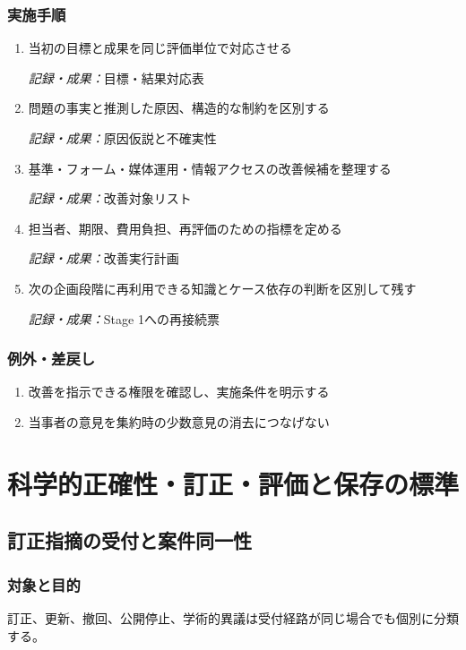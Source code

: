 \documentclass[a4paper,11pt]{article}
\begin{document}
\subsubsection*{実施手順}
\begin{enumerate}[leftmargin=2em,itemsep=0.65em]
\item 当初の目標と成果を同じ評価単位で対応させる\par\noindent\textit{記録・成果：}目標・結果対応表\nobreak\smallskip
\item 問題の事実と推測した原因、構造的な制約を区別する\par\noindent\textit{記録・成果：}原因仮説と不確実性\nobreak\smallskip
\item 基準・フォーム・媒体運用・情報アクセスの改善候補を整理する\par\noindent\textit{記録・成果：}改善対象リスト\nobreak\smallskip
\item 担当者、期限、費用負担、再評価のための指標を定める\par\noindent\textit{記録・成果：}改善実行計画\nobreak\smallskip
\item 次の企画段階に再利用できる知識とケース依存の判断を区別して残す\par\noindent\textit{記録・成果：}Stage 1への再接続票\nobreak\smallskip
\end{enumerate}
\subsubsection*{例外・差戻し}
\begin{enumerate}[leftmargin=2em,itemsep=0.35em]
\item 改善を指示できる権限を確認し、実施条件を明示する
\item 当事者の意見を集約時の少数意見の消去につなげない
\end{enumerate}
\section{科学的正確性・訂正・評価と保存の標準}
\subsection{訂正指摘の受付と案件同一性}
\subsubsection{対象と目的}
\par 訂正、更新、撤回、公開停止、学術的異議は受付経路が同じ場合でも個別に分類する。\par\medskip
\end{document}
